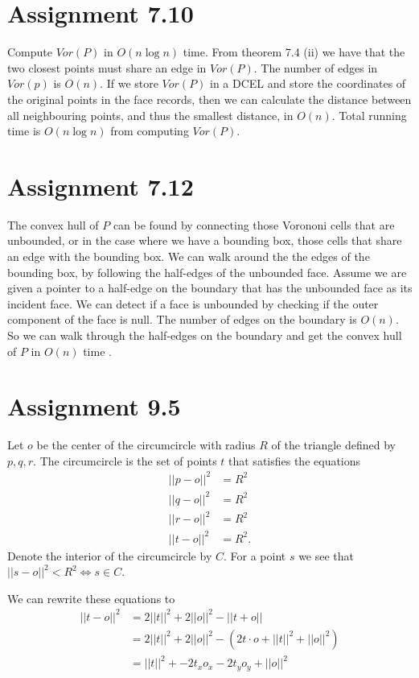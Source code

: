 \documentclass[10pt,a4paper,final,oneside,openany,article,oldfontcommands]{memoir}
\begin{document}
\chapter*{Assignment 7.10}
Compute $Vor(P)$ in $O(n \log n)$ time. From theorem 7.4 (ii) we have that the two closest points must share an edge in $Vor(P)$. The number of edges in $Vor(p)$ is $O(n)$. If we store $Vor(P)$ in a DCEL and store the coordinates of the original points in the face records, then we can calculate the distance between all neighbouring points, and thus the smallest distance, in $O(n)$. Total running time is $O(n \log n)$ from computing $Vor(P)$.


\chapter*{Assignment 7.12}
The convex hull of $P$ can be found by connecting those Vorononi cells that are unbounded, or in the case where we have a bounding box, those cells that share an edge with the bounding box. We can walk around the the edges of the bounding box, by following the half-edges of the unbounded face. Assume we are given a pointer to a half-edge on the boundary that has the unbounded face as its incident face. We can detect if a face is unbounded by checking if the outer component of the face is null. The number of edges on the boundary is $O(n)$. So we can walk through the half-edges on the boundary and get the convex hull of $P$ in $O(n)$ time .



\chapter*{Assignment 9.5}
Let $o$ be the center of the circumcircle with radius $R$ of the triangle defined by $p, q, r$. The circumcircle is the set of points $t$ that satisfies the equations
\begin{align*}
  ||p - o||^2 &= R^2\\
  ||q - o||^2 &= R^2\\
  ||r - o||^2 &= R^2\\
  ||t - o||^2 &= R^2.
\end{align*}
Denote the interior of the circumcircle by $C$. For a point $s$ we see that $||s - o||^2 < R^2 \iff s \in C$.

We can rewrite these equations to
\begin{align*}
  ||t - o||^2 &= 2||t||^2 + 2||o||^2 - ||t + o||\\
  &= 2||t||^2 + 2||o||^2 - (2 t \cdot o + ||t||^2 + ||o||^2)\\
  &= ||t||^2 +  -2t_xo_x - 2t_yo_y  + ||o||^2
\end{align*}
\end{document}
